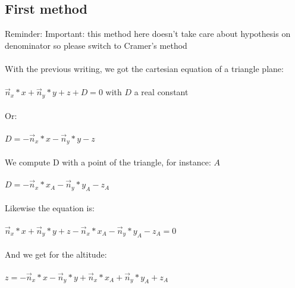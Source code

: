 \documentclass{article}
\begin{document}
		\subsection{First method}
	
			\textcolor[rgb]{1,0,0}{Reminder: Important: this method here doesn't take care about hypothesis on denominator so please switch to Cramer's method}\\\\
		
			With the previous writing, we got the cartesian equation of a triangle plane:\\\\
			
			$\vec{n}_x * x + \vec{n}_y * y + z + D = 0$ with $D$ a real constant\\\\
			
			Or:\\\\
			
			$D = - \vec{n}_x * x - \vec{n}_y * y - z$\\\\
			
			We compute D with a point of the triangle, for instance: $A$\\\\
			
			$D = - \vec{n}_x * x_A - \vec{n}_y * y_A - z_A$\\\\
			
			Likewise the equation is:\\\\
			
			$\vec{n}_x * x + \vec{n}_y * y + z - \vec{n}_x * x_A - \vec{n}_y * y_A - z_A = 0$\\\\
			
			And we get for the altitude:\\\\
			
			$z = - \vec{n}_x * x - \vec{n}_y * y + \vec{n}_x * x_A + \vec{n}_y * y_A + z_A$\\\\
\end{document}
